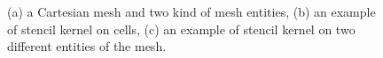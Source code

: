 \begin{figure}
\begin{center}
\hspace{10pt}
\hspace{10pt}
\end{center}
\caption{(a) a Cartesian mesh and two kind of mesh entities, (b) an example of stencil kernel on cells, (c) an example of stencil kernel on two different entities of the mesh.}
\label{fig:gspmsp}
\end{figure}

